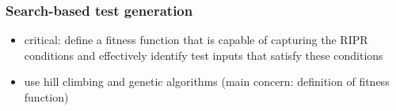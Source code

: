 \subsubsection{Search-based test generation} %

\begin{itemize}
	\item critical: define a fitness function that is capable of capturing the RIPR conditions and effectively identify test inputs that satisfy these conditions
	\item use hill climbing and genetic algorithms (main concern: definition of fitness function) 
\end{itemize}

